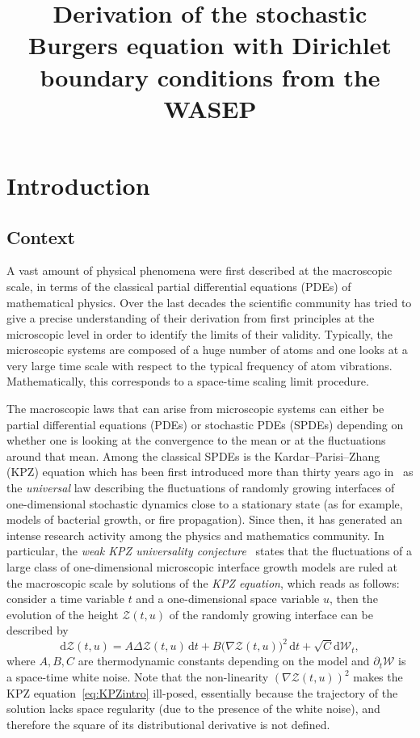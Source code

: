 \documentclass[AHL,Unicode,longabstracts]{cedram}
\title[Stochastic Burgers equation with Dirichlet boundary conditions]{Derivation of the stochastic Burgers equation with Dirichlet boundary conditions from the WASEP}
\author[\initial{P.} \lastname{Gon\c{c}alves}]{\firstname{Patr\'icia} \lastname{Gon\c{c}alves}}
\author[\initial{N.} \lastname{Perkowski}]{\firstname{Nicolas} \lastname{Perkowski}}
\author[\initial{M.} \lastname{Simon}]{\firstname{Marielle} \lastname{Simon}}
\newcommand{\mc}[1]{{\mathcal #1}}
\renewcommand{\mc}[1]{{\mathcal #1}}
\newcommand*{\dd}{\mathrm{d}}
\newcommand*{\dt}{\dd t}
\begin{document}
\maketitle

\section{Introduction}\label{s1}

\subsection{Context} A vast amount of physical phenomena were first described at the macroscopic scale, in terms of the classical partial differential equations (PDEs) of mathematical physics. Over the last decades the scientific community has tried to give a precise understanding of their derivation from first principles at the microscopic level in order to identify the limits of their validity. Typically, the microscopic systems are composed of a huge number of atoms and one looks at a very large time scale with respect to the typical frequency of atom vibrations. Mathematically, this corresponds to a space-time scaling limit procedure.

The macroscopic laws that can arise from microscopic systems can either be partial differential equations (PDEs) or stochastic PDEs (SPDEs) depending on whether one is looking at the convergence to the mean or at the fluctuations around that mean. Among the classical SPDEs is the Kardar--Parisi--Zhang (KPZ) equation which has been first introduced more than thirty years ago in~\cite{KPZ} as the \emph{universal} law describing the fluctuations of randomly growing interfaces of one-dimensional stochastic dynamics close to a stationary state (as for example, models of bacterial growth, or fire propagation). Since then, it has generated an intense research activity among the physics and mathematics community. In particular, the \emph{weak KPZ universality conjecture}~\cite{Corwin12, QuaS, Sp16} states that the fluctuations of a large class of one-dimensional microscopic interface growth models are ruled at the macroscopic scale by solutions of the \emph{KPZ equation}, which reads as follows: consider a time variable $t$ and a one-dimensional space variable $u$, then the evolution of the height $\mc Z(t,u)$ of the randomly growing interface can be described by
\begin{equation}
\dd\mc Z(t,u) = A \Delta \mc Z(t,u)\,\dt + B \big(\nabla \mc Z(t,u)\big)^2 \,\dt + \sqrt C \dd \mc W_t, \label{eq:KPZintro}
\end{equation}
where $A,B,C$ are thermodynamic constants depending on the model and $\partial_t\mc W$ is a space-time white noise. Note that the non-linearity $(\nabla \mc Z(t,u))^2$ makes the KPZ equation~\eqref{eq:KPZintro} ill-posed, essentially because the trajectory of the solution lacks space regularity (due to the presence of the white noise), and therefore the square of its distributional derivative is not defined.
\end{document}
